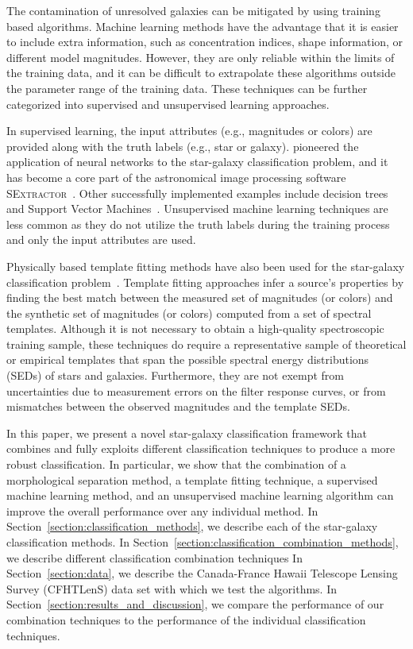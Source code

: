 \documentclass[useAMS,usenatbib]{mn2e}
\newcommand{\eg}{{e.g., }}
\begin{document}
The contamination of unresolved galaxies can be mitigated
by using training based algorithms.
Machine learning methods have the advantage that
it is easier to include extra information,
such as concentration indices, shape information,
or different model magnitudes.
However,
they are only reliable within the limits of the training data,
and it can be difficult to extrapolate these algorithms
outside the parameter range of the training data.
These techniques can be further categorized into
supervised and unsupervised learning approaches.

In supervised learning, 
the input attributes (\eg magnitudes or colors)
are provided along with the truth labels (\eg star or galaxy).
\cite{odewahn1992automated} pioneered
the application of neural networks
to the star-galaxy classification problem,
and it has become a core part of
the astronomical image processing software
\textsc{SExtractor}~\citep{bertin1996sextractor}.
Other successfully implemented examples include
decision trees~\citep{weir1995automated, suchkov2005census, ball2006robust}
and Support Vector Machines~\citep{Fadely2012}.
Unsupervised machine learning techniques
are less common
as they do not utilize the truth labels during the training process
and only the input attributes are used.

Physically based template fitting methods
have also been used for the star-galaxy classification
problem~\citep{robin2007stellar, Fadely2012}.
Template fitting approaches infer a source's properties
by finding the best match between
the measured set of magnitudes (or colors)
and the synthetic set of magnitudes (or colors)
computed from a set of spectral templates.
Although it is not necessary to obtain
a high-quality spectroscopic training sample,
these techniques do require
a representative sample of theoretical or empirical templates
that span the possible spectral energy distributions (SEDs)
of stars and galaxies.
Furthermore, they are not exempt from uncertainties
due to measurement errors on the filter response curves,
or from mismatches between the observed magnitudes
and the template SEDs.

In this paper,
we present a novel star-galaxy classification framework
that combines and fully exploits different classification techniques
to produce a more robust classification.
In particular,
we show that the combination of a morphological separation method,
a template fitting technique, a supervised machine learning method,
and an unsupervised machine learning algorithm
can improve the overall performance over any individual method.
In Section~\ref{section:classification_methods},
we describe each of the star-galaxy classification methods.
In Section~\ref{section:classification_combination_methods},
we describe different classification combination techniques
In Section~\ref{section:data},
we describe the Canada-France Hawaii Telescope Lensing Survey (CFHTLenS)
data set with which we test the algorithms.
In Section~\ref{section:results_and_discussion},
we compare the performance of our combination techniques
to the performance of the individual classification techniques.
\end{document}
